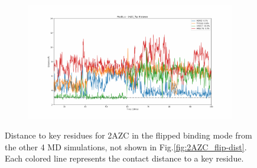 \begin{figure}[!ht]
\begin{subfigure}{.45\textwidth}
  \end{subfigure}
    \begin{subfigure}{.45\textwidth}
     \centering
     \includegraphics[width=.95\linewidth]{chapter4/2AZC_flip/2AZC_flip-dist_4.pdf}
  \end{subfigure}
\caption[Key residues distances for $2AZC_{flip}$]{Distance to key residues for 2AZC in the flipped binding mode from the other 4 MD simulations, not shown in Fig.\ref{fig:2AZC_flip-dist}. Each colored line represents the contact distance to a key residue.}
\label{sup:2AZC_flip-dist}
\end{figure}  


